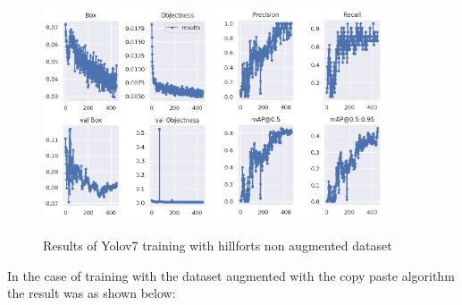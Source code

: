 \begin{figure}[H]
    \centering
    {{\includegraphics[width=5cm]{images/training/castros/notaug1.png} }}
    \qquad
    {{\includegraphics[width=5cm]{images/training/castros/notaug2.png} }}
    \caption{Results of Yolov7 training with hillforts non augmented dataset}
    \label{fig:example}
\end{figure}

In the case of training with the dataset augmented with the copy paste algorithm the result was as shown below:


